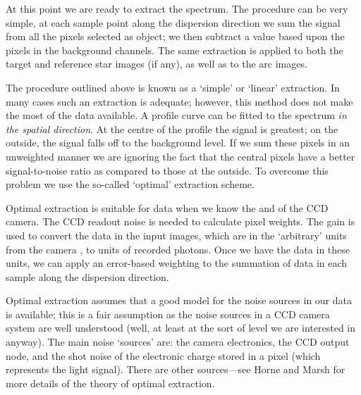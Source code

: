 \documentclass[twoside,11pt]{starlink}
\providecommand{\scspec}[2]{#1}
\begin{document}
At this point we are ready to extract the spectrum.
The procedure can be very simple, at each sample point along the
dispersion direction we sum the signal from all the pixels selected
as object; we then subtract a value based upon the pixels in the
background channels.
The same extraction is applied to both the target and reference star
images (if any), as well as to the arc images.

The procedure outlined above is known as a `simple' or `linear' extraction.
In many cases such an extraction is adequate; however,
this method does not make the most of the data available.
A profile curve can be fitted to the spectrum \emph{in the spatial direction}.
At the centre of the profile the signal is greatest;
on the outside, the signal falls off to the background level.
If we sum these pixels in an unweighted manner we are ignoring the
fact that the central pixels have a better signal-to-noise ratio as
compared to those at the outside.
To overcome this problem we use the so-called `optimal' extraction scheme.

Optimal extraction is suitable for  data
when we know the  and
 of the CCD camera.
The CCD readout noise is needed to calculate pixel weights.
The gain is used to convert the data in the input images, which are
in the `arbitrary' units from the camera , to
units of recorded photons.
Once we have the data in these units, we can apply an error-based weighting
to the summation of data in each sample along the dispersion direction.

Optimal extraction assumes that a good model for the noise
sources in our data is available; this is a fair assumption as the noise
sources in a CCD camera system are well understood (well, at least at the
sort of level we are interested in anyway).
The main noise `sources' are: the camera electronics, the CCD output node,
and the shot noise of the electronic charge stored in a pixel (which
represents the light signal).
There are other sources\scspec{---}{ - }see Horne\cite{horne} and
Marsh\cite{marsh} for more details of the theory of optimal extraction.
\end{document}
